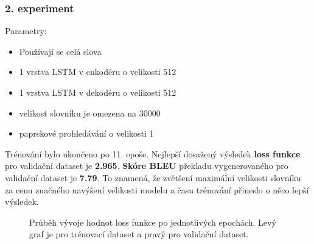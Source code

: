 \subsubsection{2. experiment}\label{experiment2}
Parametry:
\begin{itemize}
  \item Používají se celá slova
  \item 1 vrstva LSTM v enkodéru o velikosti 512
  \item 1 vrstva LSTM v dekodéru o velikosti 512
  \item velikost slovníku je omezena na 30000
  \item paprskové prohledávání o velikosti 1
\end{itemize}

Trénování bylo ukončeno po 11. epoše. Nejlepší dosažený výsledek \textbf{loss funkce} pro validační dataset je \textbf{2.965}. \textbf{Skóre BLEU} překladu vygenerovaného pro validační dataset je \textbf{7.79}. To znamená, že zvětšení maximální velikosti slovníku za cenu značného navýšení velikosti modelu a času trénování přineslo o něco lepší výsledek.

\begin{figure}[H]
    \begin{center}
    \end{center}
	\caption{Průběh vývoje hodnot loss funkce po jednotlivých epochách. Levý graf je pro trénovací dataset a pravý pro validační dataset.}
\end{figure}


